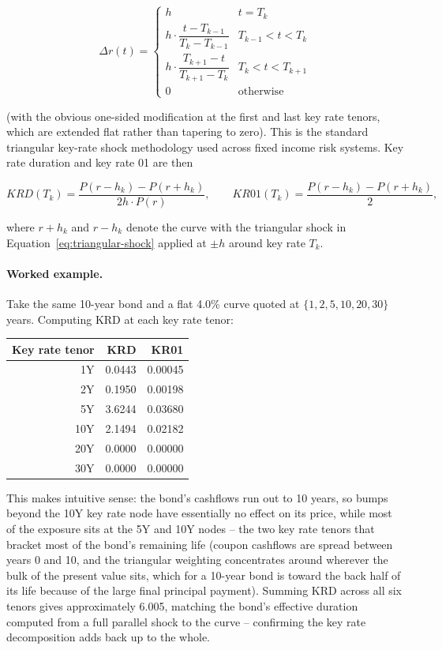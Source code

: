 \documentclass[11pt]{article}
\begin{document}
\begin{equation}
  \Delta r(t) =
  \begin{cases}
    h & t = T_k \\
    h \cdot \dfrac{t - T_{k-1}}{T_k - T_{k-1}} & T_{k-1} < t < T_k \\
    h \cdot \dfrac{T_{k+1} - t}{T_{k+1} - T_k} & T_k < t < T_{k+1} \\
    0 & \text{otherwise}
  \end{cases}
  \label{eq:triangular-shock}
\end{equation}

(with the obvious one-sided modification at the first and last key rate tenors, which are
extended flat rather than tapering to zero). This is the standard triangular key-rate shock
methodology used across fixed income risk systems. Key rate duration and key rate 01 are then

\begin{equation}
  KRD(T_k) = \frac{P(r - h_k) - P(r + h_k)}{2h \cdot P(r)}, \qquad
  KR01(T_k) = \frac{P(r - h_k) - P(r + h_k)}{2},
  \label{eq:krd}
\end{equation}

where $r + h_k$ and $r - h_k$ denote the curve with the triangular shock in
Equation~\ref{eq:triangular-shock} applied at $\pm h$ around key rate $T_k$.

\paragraph{Worked example.} Take the same 10-year bond and a flat 4.0\% curve quoted at
$\{1, 2, 5, 10, 20, 30\}$ years. Computing KRD at each key rate tenor:

\begin{center}
\begin{tabular}{@{}rrr@{}}
\toprule
Key rate tenor & KRD & KR01 \\
\midrule
1Y  & 0.0443 & 0.00045 \\
2Y  & 0.1950 & 0.00198 \\
5Y  & 3.6244 & 0.03680 \\
10Y & 2.1494 & 0.02182 \\
20Y & 0.0000 & 0.00000 \\
30Y & 0.0000 & 0.00000 \\
\bottomrule
\end{tabular}
\end{center}

This makes intuitive sense: the bond's cashflows run out to 10 years, so bumps beyond the 10Y
key rate node have essentially no effect on its price, while most of the exposure sits at the
5Y and 10Y nodes -- the two key rate tenors that bracket most of the bond's remaining life
(coupon cashflows are spread between years 0 and 10, and the triangular weighting concentrates
around wherever the bulk of the present value sits, which for a 10-year bond is toward the back
half of its life because of the large final principal payment). Summing KRD across all six
tenors gives approximately 6.005, matching the bond's effective duration computed from a full
parallel shock to the curve -- confirming the key rate decomposition adds back up to the whole.
\end{document}
